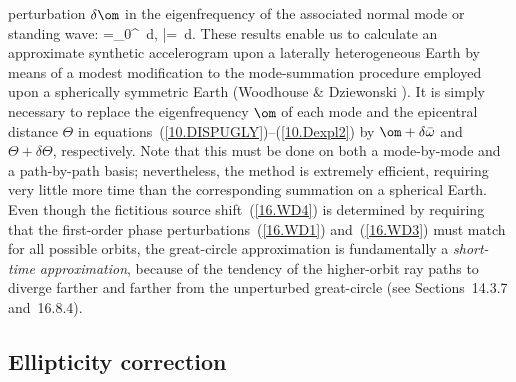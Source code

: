 perturbation $\delta\om$ in the eigenfrequency of the
associated normal mode or standing wave:
\eq \label{16.WD5}
\delta\hat{\omega}=\int_0^{\Theta}
\delta\omega\,d\phi,\qquad
\delta\bar{\omega}=\oint
\delta\omega\,d\phi.
\en
These results enable us to calculate an approximate
synthetic accelerogram upon a laterally heterogeneous
Earth by means of a modest modification to the mode-summation
procedure employed upon a spherically symmetric Earth
(Woodhouse \& Dziewonski \citeyear{woodhouse&dziewonski84}).
It is simply necessary to replace the eigenfrequency
$\om$ of each mode and the epicentral distance $\Theta$
in equations~(\ref{10.DISPUGLY})--(\ref{10.Dexpl2}) by
$\om+\delta\bar{\omega}$ and $\Theta+\delta\Theta$,
respectively.  Note that this must be done on both a
mode-by-mode and a path-by-path basis; nevertheless,
the method is extremely efficient, requiring very little
more time than the corresponding summation on a spherical Earth.
Even though the fictitious source shift~(\ref{16.WD4}) is
determined by requiring that the first-order phase
perturbations~(\ref{16.WD1}) and~(\ref{16.WD3})
must match for all possible orbits, the great-circle
approximation is fundamentally a {\em short-time
approximation\/}, because of the tendency of the
higher-orbit ray paths to diverge farther and
farther from the unperturbed great-circle
(see Sections~14.3.7 and~16.8.4).
%
%

\renewcommand{\thesubsection}{$\!\!\!\raise1.3ex\hbox{$\star$}\!\!$
\arabic{chapter}.\arabic{section}.\arabic{subsection}}
\subsection{Ellipticity correction}
%
\renewcommand{\thesubsection}{\arabic{chapter}.\arabic{section}.\arabic{subsection}}

